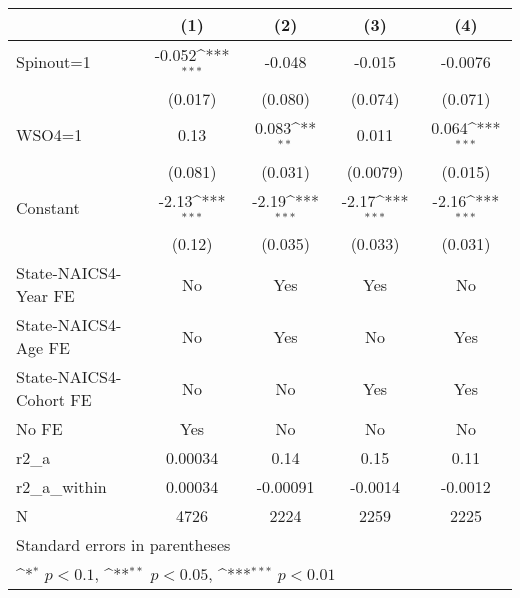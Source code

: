 {
\def\sym#1{\ifmmode^{#1}\else\(^{#1}\)\fi}
\begin{tabular}{l*{4}{c}}
\hline\hline
                    &\multicolumn{1}{c}{(1)}         &\multicolumn{1}{c}{(2)}         &\multicolumn{1}{c}{(3)}         &\multicolumn{1}{c}{(4)}         \\
\hline
Spinout=1           &      -0.052\sym{***}&      -0.048         &      -0.015         &     -0.0076         \\
                    &     (0.017)         &     (0.080)         &     (0.074)         &     (0.071)         \\
[1em]
WSO4=1              &        0.13         &       0.083\sym{**} &       0.011         &       0.064\sym{***}\\
                    &     (0.081)         &     (0.031)         &    (0.0079)         &     (0.015)         \\
[1em]
Constant            &       -2.13\sym{***}&       -2.19\sym{***}&       -2.17\sym{***}&       -2.16\sym{***}\\
                    &      (0.12)         &     (0.035)         &     (0.033)         &     (0.031)         \\
[1em]
State-NAICS4-Year FE&          No         &         Yes         &         Yes         &          No         \\
[1em]
State-NAICS4-Age FE &          No         &         Yes         &          No         &         Yes         \\
[1em]
State-NAICS4-Cohort FE&          No         &          No         &         Yes         &         Yes         \\
[1em]
No FE               &         Yes         &          No         &          No         &          No         \\
\hline
r2\_a                &     0.00034         &        0.14         &        0.15         &        0.11         \\
r2\_a\_within         &     0.00034         &    -0.00091         &     -0.0014         &     -0.0012         \\
N                   &        4726         &        2224         &        2259         &        2225         \\
\hline\hline
\multicolumn{5}{l}{\footnotesize Standard errors in parentheses}\\
\multicolumn{5}{l}{\footnotesize \sym{*} \(p<0.1\), \sym{**} \(p<0.05\), \sym{***} \(p<0.01\)}\\
\end{tabular}
}
